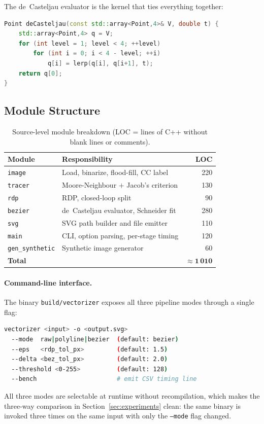 \documentclass[twocolumn,a4paper,10pt]{article}
\begin{document}
The de~Casteljau evaluator is the kernel that ties everything
together:
\begin{lstlisting}[language=C++]
Point deCasteljau(const std::array<Point,4>& V, double t) {
    std::array<Point,4> q = V;
    for (int level = 1; level < 4; ++level)
        for (int i = 0; i < 4 - level; ++i)
            q[i] = lerp(q[i], q[i+1], t);
    return q[0];
}
\end{lstlisting}

\subsection*{Module Structure}

\begin{table}[h]
\caption{Source-level module breakdown (LOC = lines of C++ without blank
         lines or comments).}
\label{tab:modules}
\centering\small
\begin{tabular}{@{}lp{}r@{}}
\toprule
Module & Responsibility & LOC \\ \midrule
\texttt{image}        & Load, binarize, flood-fill, CC label & 220 \\
\texttt{tracer}       & Moore-Neighbour $+$ Jacob's criterion & 130 \\
\texttt{rdp}          & RDP, closed-loop split                &  90 \\
\texttt{bezier}       & de~Casteljau evaluator, Schneider fit & 280 \\
\texttt{svg}          & SVG path builder and file emitter     & 110 \\
\texttt{main}         & CLI, option parsing, per-stage timing & 120 \\
\texttt{gen\_synthetic} & Synthetic image generator           &  60 \\ \midrule
\textbf{Total}        &                                       & $\approx\mathbf{1\,010}$ \\ \bottomrule
\end{tabular}
\end{table}

\paragraph*{Command-line interface.}
The binary \texttt{build/vectorizer} exposes all three pipeline modes
through a single flag:
\begin{lstlisting}[language=bash]
vectorizer <input> -o <output.svg>
  --mode  raw|polyline|bezier  (default: bezier)
  --eps   <rdp_tol_px>         (default: 1.5)
  --delta <bez_tol_px>         (default: 2.0)
  --threshold <0-255>          (default: 128)
  --bench                      # emit CSV timing line
\end{lstlisting}
All three modes are selectable at runtime without recompilation, which
makes the three-way comparison in Section~\ref{sec:experiments} clean:
the same binary is invoked three times on the same input with only the
\texttt{--mode} flag changed.
\end{document}
